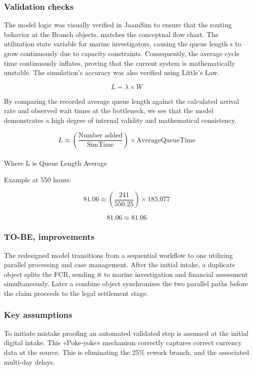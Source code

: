 \subsubsection{Validation checks}
The model logic was visually verified in JaamSim to ensure that the routing behavior at the Branch objects, matches the conceptual flow chart. The utilization state variable for marine investigators, causing the queue length s to grow continuously due to capacity constraints. Consequently, the average cycle time continuously inflates, proving that the current system is mathematically unstable. The simulation's accuracy was also verified using Little's Law. 

\[
L = \lambda \times W
\]

By comparing the recorded average queue length against the calculated arrival rate and observed wait times at the bottleneck, we see that the model demonstrates a high degree of internal validity and mathematical consistency. 

\[
L \approx \left(\frac{\text{Number added}}{\text{SimTime}}\right) \times \text{AverageQueueTime}
\]
\\
Where L is Queue Length Average

Example at 550 hours:

\[
81.06 \approx \left(\frac{241}{550.25}\right) \times 185.077
\]

\[
81.06 \approx 81.06
\]

\subsubsection{TO-BE, improvements}

The redesigned model transitions from a sequential workflow to one utilizing parallel processing and case management. After the initial intake, a duplicate object splits the FCR, sending it to marine investigation and financial assessment simultaneously. Later a combine object synchronizes the two parallel paths before the claim proceeds to the legal settlement stage.  

\subsubsection{Key assumptions} 

To initiate mistake proofing an automated validated step is assumed at the initial digital intake. This «Poke-yoke» mechanism correctly captures correct currency data at the source. This is eliminating the 25\% rework branch, and the associated multi-day delays. \\

